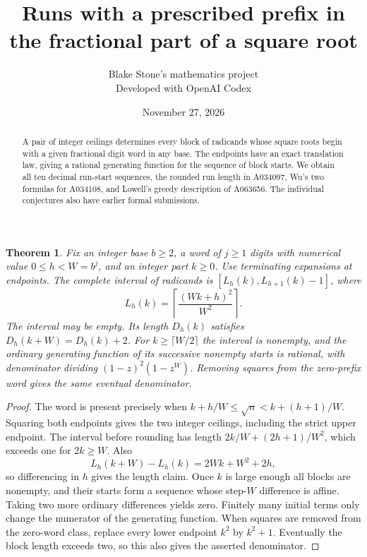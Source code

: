\documentclass[11pt]{article}
\title{Runs with a prescribed prefix in the fractional part of a square root}
\author{Blake Stone's mathematics project\\\small Developed with OpenAI Codex}
\date{November 27, 2026}
\newtheorem{theorem}{Theorem}\newcommand{\seqref}[1]{\href{https://oeis.org/#1}{#1}}
\begin{document}
\maketitle
\begin{abstract}A pair of integer ceilings determines every block of radicands whose square roots begin with a given fractional digit word in any base. The endpoints have an exact translation law, giving a rational generating function for the sequence of block starts. We obtain all ten decimal run-start sequences, the rounded run length in A034097, Wu's two formulas for A034108, and Lowell's greedy description of A063656. The individual conjectures also have earlier formal submissions.\end{abstract}
\begin{theorem}Fix an integer base $b\ge2$, a word of $j\ge1$ digits with numerical value $0\le h<W=b^j$, and an integer part $k\ge0$. Use terminating expansions at endpoints. The complete interval of radicands is $[L_h(k),L_{h+1}(k)-1]$, where
\[
 L_h(k)=\left\lceil\frac{(Wk+h)^2}{W^2}\right\rceil.
\]
The interval may be empty. Its length $D_h(k)$ satisfies $D_h(k+W)=D_h(k)+2$. For $k\ge\lceil W/2\rceil$ the interval is nonempty, and the ordinary generating function of its successive nonempty starts is rational, with denominator dividing $(1-z)^2(1-z^W)$. Removing squares from the zero-prefix word gives the same eventual denominator.\end{theorem}
\begin{proof}The word is present precisely when $k+h/W\le\sqrt n<k+(h+1)/W$. Squaring both endpoints gives the two integer ceilings, including the strict upper endpoint. The interval before rounding has length $2k/W+(2h+1)/W^2$, which exceeds one for $2k\ge W$. Also
\[
 L_h(k+W)-L_h(k)=2Wk+W^2+2h,
\]
so differencing in $h$ gives the length claim. Once $k$ is large enough all blocks are nonempty, and their starts form a sequence whose step-$W$ difference is affine. Taking two more ordinary differences yields zero. Finitely many initial terms only change the numerator of the generating function. When squares are removed from the zero-word class, replace every lower endpoint $k^2$ by $k^2+1$. Eventually the block length exceeds two, so this also gives the asserted denominator.\end{proof}
\end{document}
